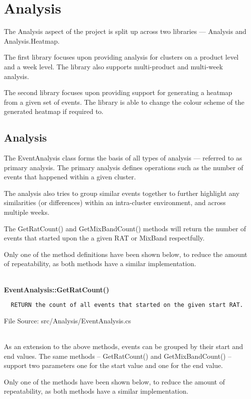 \section{Analysis}
The Analysis aspect of the project is split up across two libraries --- 
Analysis and Analysis.Heatmap.

The first library focuses upon providing analysis for clusters on a product 
level and a week level. The library also supports multi-product and multi-week 
analysis.

The second library focuses upon providing support for generating a heatmap from
a given set of events. The library is able to change the colour scheme of the 
generated heatmap if required to.


\subsection{Analysis}
The EventAnalysis class forms the basis of all types of analysis --- referred 
to as primary analysis. The primary analysis defines operations such as the 
number of events that happened within a given cluster.

The analysis also tries to group similar events together to further highlight 
any similarities (or differences) within an intra-cluster environment, and 
across multiple weeks.

The {\ttfamily GetRatCount()} and {\ttfamily GetMixBandCount()} methods will 
return the number of events that started upon the a given RAT or MixBand 
respectfully.

Only one of the method definitions have been shown below, to reduce the amount
of repeatability, as both methods have a similar implementation.

~\\
{\bfseries EventAnalysis::GetRatCount()}
\lstset{style=pseudocode}
\begin{lstlisting}
  RETURN the count of all events that started on the given start RAT.
\end{lstlisting}
{\textsf \footnotesize File Source: src/Analysis/EventAnalysis.cs }

~\\
As an extension to the above methods, events can be grouped by their start and 
end values. The same methods -- {\ttfamily GetRatCount()} and 
{\ttfamily GetMixBandCount()} -- support two parameters one for the start value
and one for the end value. 

Only one of the methods have been shown below, to reduce the amount of 
repeatability, as both methods have a similar implementation.

